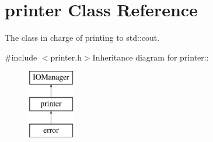 \hypertarget{classJKBuilder_1_1printer}{
\section{printer Class Reference}
\label{classJKBuilder_1_1printer}
}


The class in charge of printing to std::cout.  


{\ttfamily \#include $<$printer.h$>$}Inheritance diagram for printer::\begin{figure}[H]
\begin{center}
\leavevmode
\includegraphics[height=3cm]{classJKBuilder_1_1printer}
\end{center}
\end{figure}
